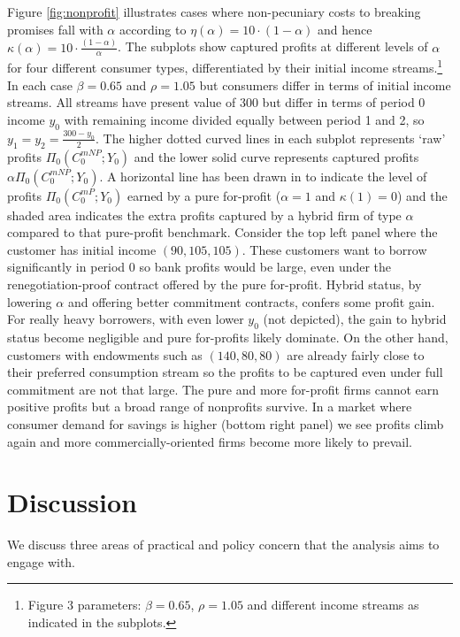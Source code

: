 \documentclass[11pt,english]{article}
\theoremstyle{plain}
\theoremstyle{definition}
\begin{document}
Figure \ref{fig:nonprofit} illustrates cases where non-pecuniary
costs to breaking promises fall with $\alpha$
according to $\eta(\alpha)=10 \cdot (1-\alpha)$ and hence $\kappa(\alpha)=10 \cdot \frac{(1-\alpha)}{\alpha}$.
The subplots show captured profits at different
levels of $\alpha$ for four  different consumer types, differentiated by their initial income streams.\footnote{Figure 3 parameters: $\beta=0.65$, $\rho=1.05$ and different income streams as indicated in the subplots.} In each case \(\beta=0.65\) and $\rho=1.05$ but consumers differ in terms of initial  income streams. All streams have present value of 300
but differ  in terms of period 0 income \(y_{0}\) with remaining income  divided equally between period 1 and 2, so \(y_1=y_2=\frac{300-y_0}{2}\). 
 The higher dotted curved lines in each subplot
represents `raw' profits $\Pi_{0}(C_{0}^{mNP};Y_{0})$ and the lower
solid curve represents captured profits $\alpha\Pi_{0}(C_{0}^{mNP};Y_{0})$. A horizontal
line has been drawn in to indicate the level of profits $\Pi_{0}(C_{0}^{mP};Y_{0})$
earned by a pure for-profit ($\alpha=1$ and $\kappa (1)=0$) and the shaded area indicates the extra profits captured by a hybrid firm of type \(\alpha\) compared to that pure-profit benchmark. Consider the top left panel
where the customer has initial income $(90,105,105)$. These  customers want to borrow significantly in period 0 so bank
profits would be large, even under the renegotiation-proof contract offered by the pure for-profit. Hybrid status, by lowering $\alpha$ and offering better commitment contracts, confers some profit gain.
For really heavy borrowers, with even lower \(y_{0}\) (not depicted), the gain to hybrid status become negligible  and  pure for-profits likely dominate. On the other hand, customers with endowments such as  $(140,80,80)$ are already fairly close
to their preferred consumption stream so the profits to be captured
even under full commitment are not that large. The pure and more for-profit firms cannot  earn positive profits but a broad range of nonprofits survive.  In a market where consumer demand for savings is higher (bottom right panel) we see  profits climb again and more commercially-oriented firms become more likely to prevail. 

\section{Discussion}

We discuss three areas of practical and policy concern that the
analysis aims to engage with.
\end{document}
